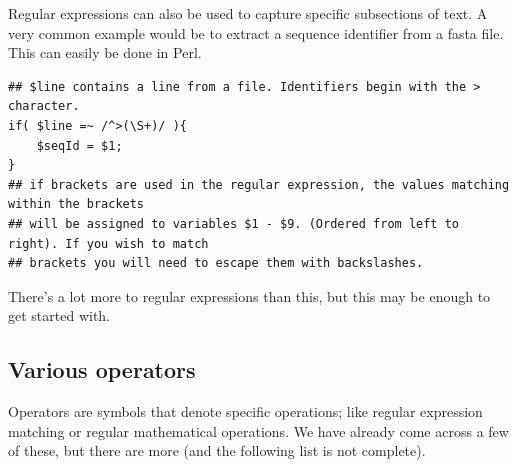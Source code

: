 \documentclass[11pt]{article}
\begin{document}
Regular expressions can also be used to capture specific subsections of
text. A very common example would be to extract a sequence identifier
from a fasta file. This can easily be done in Perl.

\begin{verbatim}
## $line contains a line from a file. Identifiers begin with the > character.
if( $line =~ /^>(\S+)/ ){
    $seqId = $1;
}
## if brackets are used in the regular expression, the values matching within the brackets
## will be assigned to variables $1 - $9. (Ordered from left to right). If you wish to match
## brackets you will need to escape them with backslashes.
\end{verbatim}

There's a lot more to regular expressions than this, but this may be enough to get
started with.

\subsection{Various operators}
\label{sec:orgheadline32}

Operators are symbols that denote specific operations; like regular
expression matching or regular mathematical operations. We have already
come across a few of these, but there are more (and the following list
is not complete).
\end{document}
